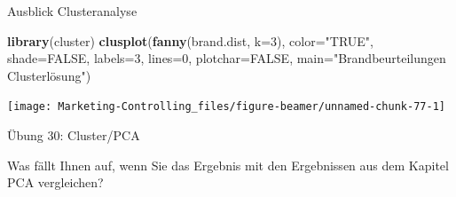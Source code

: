 \documentclass[12pt,ngerman,a4paper,ignorenonframetext,]{beamer}
\newenvironment{Shaded}{\begin{snugshade}}{\end{snugshade}}
\newcommand{\DataTypeTok}[1]{\textcolor[rgb]{0.13,0.29,0.53}{#1}}
\newcommand{\DecValTok}[1]{\textcolor[rgb]{0.00,0.00,0.81}{#1}}
\newcommand{\KeywordTok}[1]{\textcolor[rgb]{0.13,0.29,0.53}{\textbf{#1}}}
\newcommand{\NormalTok}[1]{#1}
\newcommand{\OtherTok}[1]{\textcolor[rgb]{0.56,0.35,0.01}{#1}}
\newcommand{\StringTok}[1]{\textcolor[rgb]{0.31,0.60,0.02}{#1}}
\begin{document}
\begin{frame}{Ausblick Clusteranalyse}
\protect\hypertarget{ausblick-clusteranalyse}{}

\begin{Shaded}
\begin{Highlighting}[]
\KeywordTok{library}\NormalTok{(cluster)}
\KeywordTok{clusplot}\NormalTok{(}\KeywordTok{fanny}\NormalTok{(brand.dist, }\DataTypeTok{k=}\DecValTok{3}\NormalTok{), }\DataTypeTok{color=}\StringTok{"TRUE"}\NormalTok{, }\DataTypeTok{shade=}\OtherTok{FALSE}\NormalTok{, }
         \DataTypeTok{labels=}\DecValTok{3}\NormalTok{, }\DataTypeTok{lines=}\DecValTok{0}\NormalTok{, }\DataTypeTok{plotchar=}\OtherTok{FALSE}\NormalTok{,}
         \DataTypeTok{main=}\StringTok{"Brandbeurteilungen Clusterlösung"}\NormalTok{)}
\end{Highlighting}
\end{Shaded}

\begin{center}\texttt{[image: Marketing-Controlling\_files/figure-beamer/unnamed-chunk-77-1]} \end{center}

\end{frame}

\begin{frame}{Übung 30: Cluster/PCA}
\protect\hypertarget{ubung-30-clusterpca}{}

Was fällt Ihnen auf, wenn Sie das Ergebnis mit den Ergebnissen aus dem
Kapitel PCA vergleichen?


\end{frame}
\end{document}
